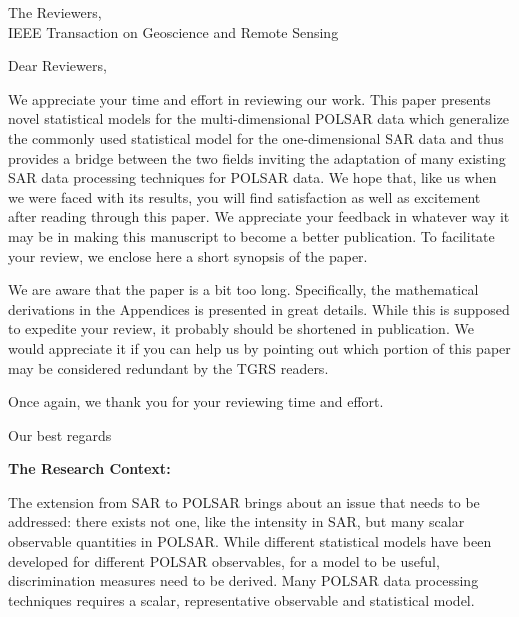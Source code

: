 \documentclass{letter}
\begin{document}
 
\begin{letter}{The Reviewers,\\IEEE Transaction on Geoscience and Remote Sensing}
\opening{Dear Reviewers,}





We appreciate your time and effort in reviewing our work.
This paper presents novel statistical models for the multi-dimensional POLSAR data which generalize the commonly used statistical model for the one-dimensional SAR data and thus provides a bridge between the two fields inviting the adaptation of many existing SAR data processing techniques for POLSAR data.
We hope that, like us when we were faced with its results,
  you will find satisfaction as well as excitement after reading through this paper.
We appreciate your feedback in whatever way it may be in making this manuscript to become a better publication.
To facilitate your review, we enclose here a short synopsis of the paper.

We are aware that the paper is a bit too long.
Specifically, the mathematical derivations in the Appendices is presented in great details.
While this is supposed to expedite your review,
  it probably should be shortened in publication.
We would appreciate it if you can help us by pointing out which portion of this paper may be considered redundant by the TGRS readers. 

Once again, we thank you for your reviewing time and effort.

\closing{Our best regards}


\newpage
\textbf{The Research Context:}

The extension from SAR to POLSAR brings about an issue that needs to be addressed:
  there exists not one, like the intensity in SAR, but many scalar observable quantities in POLSAR. 
While different statistical models have been developed for different POLSAR observables, 
  for a model to be useful, discrimination measures need to be derived.
Many POLSAR data processing techniques requires a scalar, representative observable and statistical model.


\end{letter}
\end{document}
